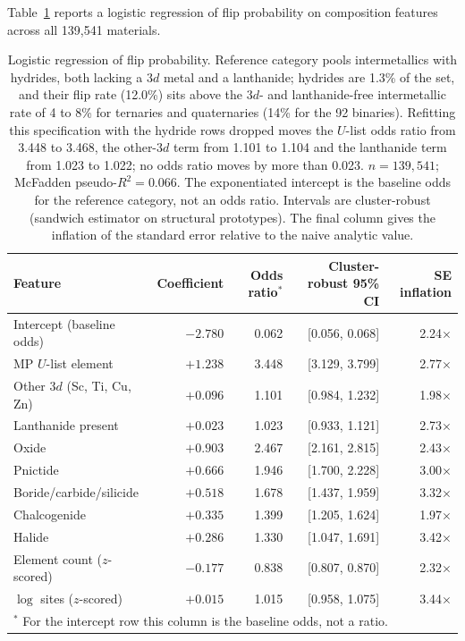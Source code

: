 \documentclass[11pt]{article}
\begin{document}
Table~\ref{tab:logit} reports a logistic regression of flip probability on composition
features across all 139{,}541 materials.

\begin{table}[htbp]\centering
\caption{Logistic regression of flip probability. Reference category pools intermetallics
with hydrides, both lacking a 3$d$ metal and a lanthanide; hydrides are 1.3\% of the set,
and their flip rate (12.0\%) sits above the 3$d$- and lanthanide-free intermetallic rate
of 4 to 8\% for ternaries and quaternaries (14\% for the 92 binaries). Refitting this specification with the hydride rows dropped moves the $U$-list
odds ratio from 3.448 to 3.468, the other-3$d$ term from 1.101 to 1.104 and the
lanthanide term from 1.023 to 1.022; no odds ratio moves by more than 0.023.
$n=139{,}541$; McFadden pseudo-$R^2 = 0.066$. The exponentiated intercept is the
baseline odds for the reference category, not an odds ratio. Intervals are
cluster-robust (sandwich estimator on structural prototypes). The final column gives the
inflation of the standard error relative to the naive analytic value.}
\label{tab:logit}
\small\begin{tabular}{lrrrr}
\toprule
Feature & Coefficient & Odds ratio$^{*}$ & Cluster-robust 95\% CI & SE inflation \\
\midrule
Intercept (baseline odds)    & $-2.780$ & 0.062 & [0.056, 0.068] & 2.24$\times$ \\
MP $U$-list element          & $+1.238$ & 3.448 & [3.129, 3.799] & 2.77$\times$ \\
Other 3$d$ (Sc, Ti, Cu, Zn)  & $+0.096$ & 1.101 & [0.984, 1.232] & 1.98$\times$ \\
Lanthanide present           & $+0.023$ & 1.023 & [0.933, 1.121] & 2.73$\times$ \\
Oxide                        & $+0.903$ & 2.467 & [2.161, 2.815] & 2.43$\times$ \\
Pnictide                     & $+0.666$ & 1.946 & [1.700, 2.228] & 3.00$\times$ \\
Boride/carbide/silicide      & $+0.518$ & 1.678 & [1.437, 1.959] & 3.32$\times$ \\
Chalcogenide                 & $+0.335$ & 1.399 & [1.205, 1.624] & 1.97$\times$ \\
Halide                       & $+0.286$ & 1.330 & [1.047, 1.691] & 3.42$\times$ \\
Element count ($z$-scored)   & $-0.177$ & 0.838 & [0.807, 0.870] & 2.32$\times$ \\
$\log$ sites ($z$-scored)    & $+0.015$ & 1.015 & [0.958, 1.075] & 3.44$\times$ \\
\bottomrule
\multicolumn{5}{l}{\footnotesize $^{*}$ For the intercept row this column is the baseline
odds, not a ratio.} \\
\end{tabular}
\end{table}
\end{document}
